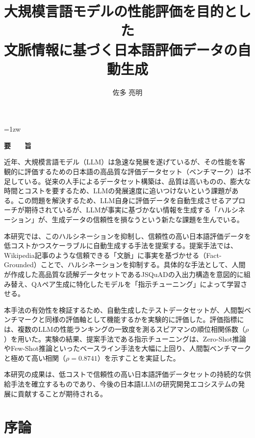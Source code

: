 \documentclass[a4paper,11pt]{jreport}
\title{大規模言語モデルの性能評価を目的とした\\[2mm]
文脈情報に基づく日本語評価データの自動生成}
\author{佐多 亮明}
\begin{document}
\maketitle
\thispagestyle{empty}
\newpage

\thispagestyle{empty}
\vspace*{20pt plus 1fil}
\parindent=1zw
\noindent
\begin{center}
{\Large \bf 要　　旨}
\vspace{2cm}
\end{center}
近年、大規模言語モデル（LLM）は急速な発展を遂げているが、その性能を客観的に評価するための日本語の高品質な評価データセット（ベンチマーク）は不足している。従来の人手によるデータセット構築は、品質は高いものの、膨大な時間とコストを要するため、LLMの発展速度に追いつけないという課題がある。この問題を解決するため、LLM自身に評価データを自動生成させるアプローチが期待されているが、LLMが事実に基づかない情報を生成する「ハルシネーション」が、生成データの信頼性を損なうという新たな課題を生んでいる。

本研究では、このハルシネーションを抑制し、信頼性の高い日本語評価データを低コストかつスケーラブルに自動生成する手法を提案する。提案手法では、Wikipedia記事のような信頼できる「文脈」に事実を基づかせる（Fact-Grounded）ことで、ハルシネーションを抑制する。具体的な手法として、人間が作成した高品質な読解データセットであるJSQuADの入出力構造を意図的に組み替え、QAペア生成に特化したモデルを「指示チューニング」によって学習させる。

本手法の有効性を検証するため、自動生成したテストデータセットが、人間製ベンチマークと同様の評価軸として機能するかを実験的に評価した。評価指標には、複数のLLMの性能ランキングの一致度を測るスピアマンの順位相関係数（$\rho$）を用いた。実験の結果、提案手法である指示チューニングは、Zero-Shot推論やFew-Shot推論といったベースライン手法を大幅に上回り、人間製ベンチマークと極めて高い相関（$\rho = 0.8741$）を示すことを実証した。

本研究の成果は、低コストで信頼性の高い日本語評価データセットの持続的な供給手法を確立するものであり、今後の日本語LLMの研究開発エコシステムの発展に貢献することが期待される。

\par
\vspace{0pt plus 1fil}
\newpage

\tableofcontents
\listoffigures
\listoftables

\pagebreak \setcounter{page}{1}

\chapter{序論}
\label{chap:introduction}
\end{document}
